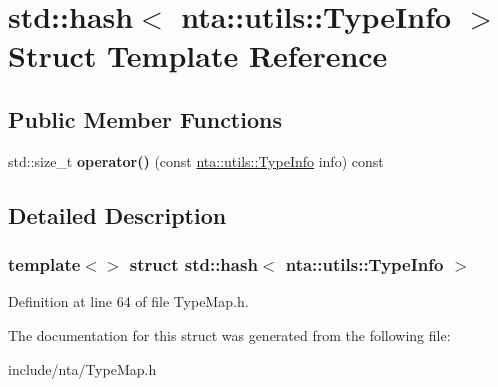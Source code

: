 \hypertarget{structstd_1_1hash_3_01nta_1_1utils_1_1TypeInfo_01_4}{}\section{std\+:\+:hash$<$ nta\+:\+:utils\+:\+:Type\+Info $>$ Struct Template Reference}
\label{structstd_1_1hash_3_01nta_1_1utils_1_1TypeInfo_01_4}
\subsection*{Public Member Functions}
\begin{DoxyCompactItemize}
\item 
\mbox{\label{structstd_1_1hash_3_01nta_1_1utils_1_1TypeInfo_01_4_a25a6fb6408c6d32fbb2429108e66aab3}} 
std\+::size\+\_\+t {\bfseries operator()} (const \hyperlink{structnta_1_1utils_1_1TypeInfo}{nta\+::utils\+::\+Type\+Info} info) const
\end{DoxyCompactItemize}


\subsection{Detailed Description}
\subsubsection*{template$<$$>$\newline
struct std\+::hash$<$ nta\+::utils\+::\+Type\+Info $>$}



Definition at line 64 of file Type\+Map.\+h.



The documentation for this struct was generated from the following file\+:\begin{DoxyCompactItemize}
\item 
include/nta/Type\+Map.\+h\end{DoxyCompactItemize}
